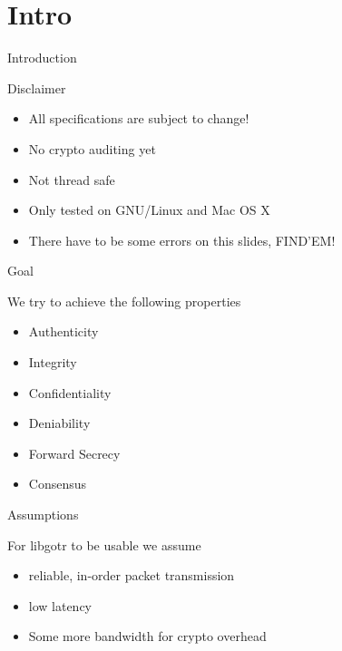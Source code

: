 \section{Intro}
\begin{frame}{Introduction}
	\begin{alertblock}{Disclaimer}
		\begin{itemize}
			\item All specifications are subject to change!
			\item No crypto auditing yet
			\item Not thread safe
			\item Only tested on GNU/Linux and Mac OS X
			\item There have to be some errors on this slides, FIND'EM!
		\end{itemize}
	\end{alertblock}
\end{frame}

\begin{frame}{Goal}
	\begin{block}{We try to achieve the following properties}
		\begin{itemize}
			\item Authenticity
			\item Integrity
			\item Confidentiality
			\item Deniability
			\item Forward Secrecy
			\item Consensus
		\end{itemize}
	\end{block}
\end{frame}

\begin{frame}{Assumptions}
	\begin{block}{For libgotr to be usable we assume}
		\begin{itemize}
			\item reliable, in-order packet transmission
			\item low latency
			\item Some more bandwidth for crypto overhead
		\end{itemize}
	\end{block}
\end{frame}
